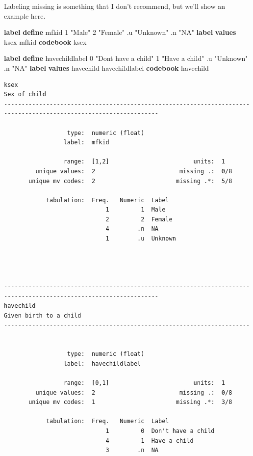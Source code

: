 \documentclass[
]{book}
\newenvironment{Shaded}{\begin{snugshade}}{\end{snugshade}}
\newcommand{\KeywordTok}[1]{\textcolor[rgb]{0.13,0.29,0.53}{\textbf{#1}}}
\newcommand{\NormalTok}[1]{#1}
\newcommand{\StringTok}[1]{\textcolor[rgb]{0.31,0.60,0.02}{#1}}
\begin{document}
Labeling missing is something that I don't recommend, but we'll show an example here.

\begin{Shaded}
\begin{Highlighting}[]
\KeywordTok{label} \KeywordTok{define}\NormalTok{ mfkid 1 }\StringTok{"Male"}\NormalTok{ 2 }\StringTok{"Female"}\NormalTok{ .u }\StringTok{"Unknown"}\NormalTok{ .n }\StringTok{"NA"}
\KeywordTok{label} \KeywordTok{values}\NormalTok{ ksex mfkid}
\KeywordTok{codebook}\NormalTok{ ksex}

\KeywordTok{label} \KeywordTok{define}\NormalTok{ havechildlabel 0 }\StringTok{"Don\textquotesingle{}t have a child"}\NormalTok{ 1 }\StringTok{"Have a child"}\NormalTok{ .u }\StringTok{"Unknown"}\NormalTok{ .n }\StringTok{"NA"}
\KeywordTok{label} \KeywordTok{values}\NormalTok{ havechild havechildlabel}
\KeywordTok{codebook}\NormalTok{ havechild}
\end{Highlighting}
\end{Shaded}

\begin{verbatim}
ksex                                                                                                  Sex of child
------------------------------------------------------------------------------------------------------------------

                  type:  numeric (float)
                 label:  mfkid

                 range:  [1,2]                        units:  1
         unique values:  2                        missing .:  0/8
       unique mv codes:  2                       missing .*:  5/8

            tabulation:  Freq.   Numeric  Label
                             1         1  Male
                             2         2  Female
                             4        .n  NA
                             1        .u  Unknown




------------------------------------------------------------------------------------------------------------------
havechild                                                                                   Given birth to a child
------------------------------------------------------------------------------------------------------------------

                  type:  numeric (float)
                 label:  havechildlabel

                 range:  [0,1]                        units:  1
         unique values:  2                        missing .:  0/8
       unique mv codes:  1                       missing .*:  3/8

            tabulation:  Freq.   Numeric  Label
                             1         0  Don't have a child
                             4         1  Have a child
                             3        .n  NA
\end{verbatim}
\end{document}
